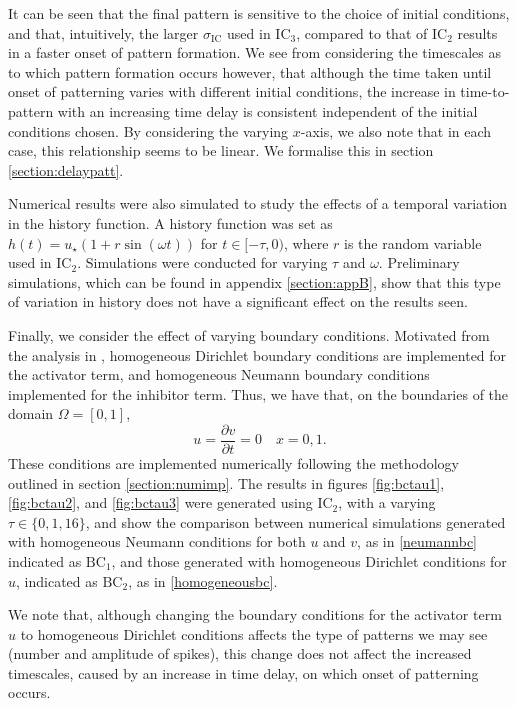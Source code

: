 It can be seen that the final pattern is sensitive to the choice of initial conditions, and that, intuitively, the larger $\sigma_{\text{IC}}$ used in $\text{IC}_3$, compared to that of $\text{IC}_2$ results in a faster onset of pattern formation. We see from considering the timescales as to which pattern formation occurs however, that although the time taken until onset of patterning varies with different initial conditions, the increase in time-to-pattern with an increasing time delay is consistent independent of the initial conditions chosen. By considering the varying $x$-axis, we also note that in each case, this relationship seems to be linear. We formalise this in section \ref{section:delaypatt}.

Numerical results were also simulated to study the effects of a temporal variation in the history function. A history function was set as $h(t)=u_\star(1+r\sin(\omega t))$ for $t\in[-\tau,0)$, where $r$ is the random variable used in $\text{IC}_2$. Simulations were conducted for varying $\tau$ and $\omega$. Preliminary simulations, which can be found in appendix \ref{section:appB}, show that this type of variation in history does not have a significant effect on the results seen.

Finally, we consider the effect of varying boundary conditions. Motivated from the analysis in \cite{krausemixed}, homogeneous Dirichlet boundary conditions are implemented for the activator term, and homogeneous Neumann boundary conditions implemented for the inhibitor term. Thus, we have that, on the boundaries of the domain $\Omega=[0,1]$,
\begin{equation}\label{homogeneousbc}
u=\frac{\partial v}{\partial t}=0 \quad x=0, 1.
\end{equation}
These conditions are implemented numerically following the methodology outlined in section \ref{section:numimp}. The results in figures \ref{fig:bctau1}, \ref{fig:bctau2}, and \ref{fig:bctau3} were generated using $\text{IC}_2$, with a varying $\tau\in\{0,1,16\}$, and show the comparison between numerical simulations generated with homogeneous Neumann conditions for both $u$ and $v$, as in \eqref{neumannbc} indicated as $\text{BC}_1$, and those generated with homogeneous Dirichlet conditions for $u$, indicated as $\text{BC}_2$, as in \eqref{homogeneousbc}.

We note that, although changing the boundary conditions for the activator term $u$ to homogeneous Dirichlet conditions affects the type of patterns we may see (number and amplitude of spikes), this change does not affect the increased timescales, caused by an increase in time delay, on which onset of patterning occurs.

